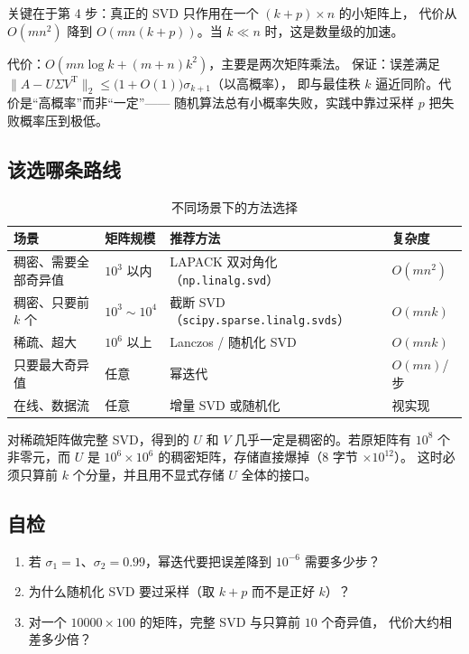 \documentclass[UTF8, 11pt, a4paper, fontset=windows]{ctexart}
\theoremstyle{cnthm}
\theoremstyle{cndef}
\newcommand{\T}{^{\mathrm{T}}}
\newcommand{\nrm}[1]{\lVert #1 \rVert}
\begin{document}
关键在于第 4 步：真正的 SVD 只作用在一个 $(k+p)\times n$ 的小矩阵上，
代价从 $O(mn^2)$ 降到 $O(mn(k+p))$。当 $k\ll n$ 时，这是数量级的加速。

\begin{keybox}[随机化算法的代价与保证]
代价：$O(mn\log k + (m+n)k^2)$，主要是两次矩阵乘法。
保证：误差满足
$\nrm{A-U\Sigma V\T}_2\le\big(1+O(1)\big)\sigma_{k+1}$（以高概率），
即与最佳秩 $k$ 逼近同阶。代价是“高概率”而非“一定”——
随机算法总有小概率失败，实践中靠过采样 $p$ 把失败概率压到极低。
\end{keybox}

\subsection{该选哪条路线}

\begin{table}[htbp]
\centering
\small
\caption{不同场景下的方法选择}\label{tab:methods}
\renewcommand{\arraystretch}{1.35}
\begin{tabular}{@{}>{\raggedright\arraybackslash}p{3.4cm}>{\raggedright\arraybackslash}p{2.6cm}>{\raggedright\arraybackslash}p{5.2cm}>{\raggedright\arraybackslash}p{3.2cm}@{}}
\toprule
\textbf{场景} & \textbf{矩阵规模} & \textbf{推荐方法} & \textbf{复杂度} \\
\midrule
稠密、需要全部奇异值 & $10^3$ 以内 & LAPACK 双对角化（\texttt{np.linalg.svd}） & $O(mn^2)$ \\
稠密、只要前 $k$ 个 & $10^3\sim10^4$ & 截断 SVD（\texttt{scipy.sparse.linalg.svds}） & $O(mnk)$ \\
稀疏、超大 & $10^6$ 以上 & Lanczos / 随机化 SVD & $O(mnk)$ \\
只要最大奇异值 & 任意 & 幂迭代 & $O(mn)$/步 \\
在线、数据流 & 任意 & 增量 SVD 或随机化 & 视实现 \\
\bottomrule
\end{tabular}
\end{table}

\begin{warnbox}[稀疏矩阵的陷阱]
对稀疏矩阵做完整 SVD，得到的 $U$ 和 $V$ 几乎一定是稠密的。若原矩阵有 $10^8$
个非零元，而 $U$ 是 $10^6\times10^6$ 的稠密矩阵，存储直接爆掉（$8$ 字节 $\times10^{12}$）。
这时必须只算前 $k$ 个分量，并且用不显式存储 $U$ 全体的接口。
\end{warnbox}

\subsection*{自检}
\begin{enumerate}
  \item 若 $\sigma_1=1$、$\sigma_2=0.99$，幂迭代要把误差降到 $10^{-6}$ 需要多少步？
  \item 为什么随机化 SVD 要过采样（取 $k+p$ 而不是正好 $k$）？
  \item 对一个 $10000\times100$ 的矩阵，完整 SVD 与只算前 $10$ 个奇异值，
        代价大约相差多少倍？
\end{enumerate}
\end{document}
